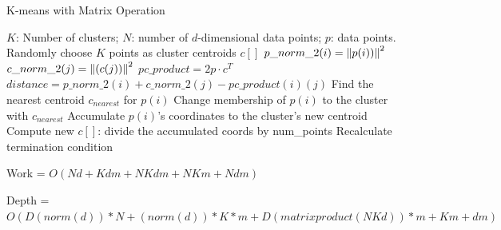 \documentclass[
nopagebreaks,
style=klope,
fleqn]{powerdot}
\begin{document}
\begin{slide}{K-means with Matrix Operation}
  \scriptsize
  \begin{algorithmic}[1]
    \INPUT $K$: Number of clusters; $N$: number of $d$-dimensional data points; $p$: data points.
     \label{alg:pm}
    \State Randomly choose $K$ points as cluster centroids $c[]$
    \State $p\_norm\_2(i) = \left\lVert p(i))\right\rVert^2$
    \EndFor
    \State $c\_norm\_2(j) = \left\lVert(c(j))\right\rVert^2$
    \EndFor
    \State $pc\_product = 2 p \cdot c^T$
    \State $distance = p\_norm\_2(i) + c\_norm\_2(j) - pc\_product(i)(j)$
    \EndFor
    \State Find the nearest centroid $c_{nearest}$ for $p(i)$
    \State Change membership of $p(i)$ to the cluster with $c_{nearest}$
    \State Accumulate $p(i)$'s coordinates to the cluster's new centroid
    \EndParFor
    \State Compute new $c[]$: divide the accumulated coords by num\_points
    \State Recalculate termination condition
    \EndWhile
    \EndFunction
  \end{algorithmic}
  \vspace{.1cm}
  \tiny
  \begin{compactitem}
  \item{Work = $O(Nd + Kdm + NKdm + NKm + Ndm)$}
  \item{Depth = $O(D(norm(d))*N + (norm(d))*K*m + D(matrix product(NKd))*m + Km + dm)$}
  \end{compactitem}
\end{slide}
\end{document}
